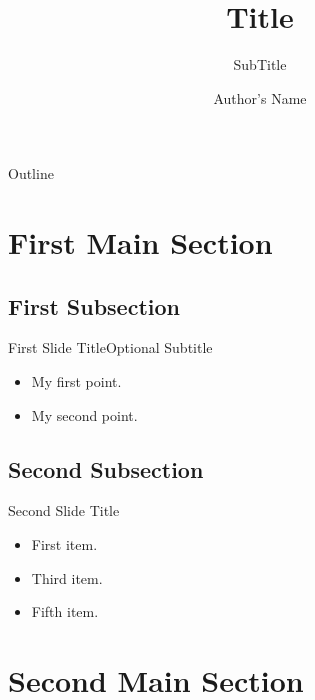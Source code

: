 \documentclass[xcolor=dvipsnames]{beamer}
\title{Title}
\subtitle{SubTitle}
\author{Author's Name}
\institute[National University of Singapore] %
{
    School of Computing\\
    National University of Singapore
}
\date{}
\begin{document}
\begin{frame}

    \titlepage
\end{frame}



\begin{frame}{Outline}
    \tableofcontents
\end{frame}


\section{First Main Section}

\subsection{First Subsection}
\begin{frame}{First Slide Title}{Optional Subtitle}
    \begin{itemize}
        \item {
                My first point.
            }
        \item {
                My second point.
            }
    \end{itemize}
\end{frame}

\subsection{Second Subsection}
\begin{frame}{Second Slide Title}
    \begin{itemize}
        \item {
                First item.
                \pause %
            }
        \item<3-> {
                Third item.
            }
        \item<5-> {
                Fifth item. 
            }
    \end{itemize}
\end{frame}

\section{Second Main Section}
\end{document}

